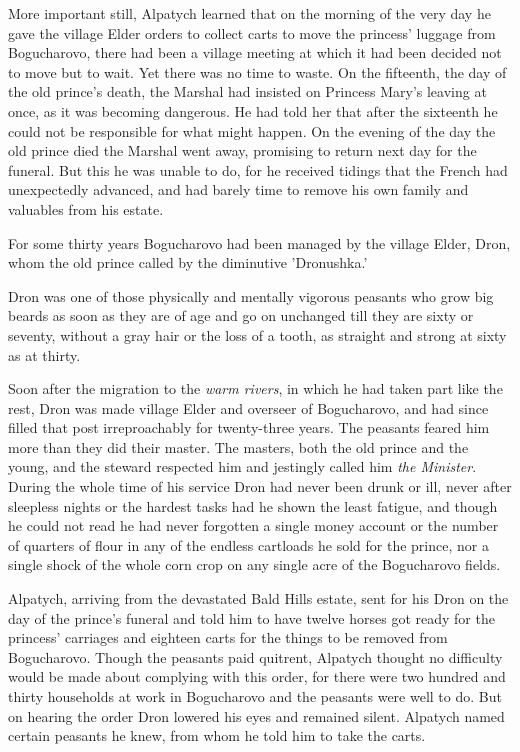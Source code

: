 More important still, Alpatych learned that on the morning of the
very day he gave the village Elder orders to collect carts to
move the princess' luggage from Bogucharovo, there had been a
village meeting at which it had been decided not to move but to
wait. Yet there was no time to waste. On the fifteenth, the day
of the old prince's death, the Marshal had insisted on Princess
Mary's leaving at once, as it was becoming dangerous. He had told
her that after the sixteenth he could not be responsible for what
might happen. On the evening of the day the old prince died the
Marshal went away, promising to return next day for the
funeral. But this he was unable to do, for he received tidings
that the French had unexpectedly advanced, and had barely time to
remove his own family and valuables from his estate.

For some thirty years Bogucharovo had been managed by the village
Elder, Dron, whom the old prince called by the diminutive
'Dronushka.'

Dron was one of those physically and mentally vigorous peasants
who grow big beards as soon as they are of age and go on
unchanged till they are sixty or seventy, without a gray hair or
the loss of a tooth, as straight and strong at sixty as at
thirty.

Soon after the migration to the \emph{warm rivers}, in which he
had taken part like the rest, Dron was made village Elder and
overseer of Bo\-gu\-cha\-ro\-vo, and had since filled that post
irreproachably for twenty-three years. The peasants feared him
more than they did their master.  The masters, both the old
prince and the young, and the steward respected him and jestingly
called him \emph{the Minister}. During the whole time of his
service Dron had never been drunk or ill, never after sleepless
nights or the hardest tasks had he shown the least fatigue, and
though he could not read he had never forgotten a single money
account or the number of quarters of flour in any of the endless
cartloads he sold for the prince, nor a single shock of the whole
corn crop on any single acre of the Bogucharovo fields.

Alpatych, arriving from the devastated Bald Hills estate, sent
for his Dron on the day of the prince's funeral and told him to
have twelve horses got ready for the princess' carriages and
eighteen carts for the things to be removed from
Bogucharovo. Though the peasants paid quitrent, Alpatych thought
no difficulty would be made about complying with this order, for
there were two hundred and thirty households at work in
Bogucharovo and the peasants were well to do. But on hearing the
order Dron lowered his eyes and remained silent. Alpatych named
certain peasants he knew, from whom he told him to take the
carts.

